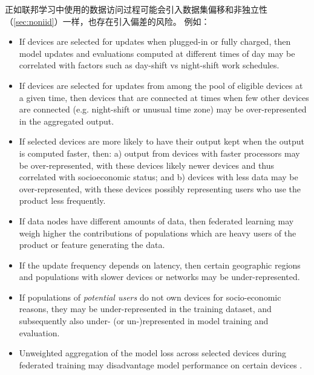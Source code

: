 正如联邦学习中使用的数据访问过程可能会引入数据集偏移和非独立性（\cref{sec:noniid}）一样，也存在引入偏差的风险。 例如：
\begin{itemize}
    \item If devices are selected for updates when plugged-in or fully charged, then model updates and evaluations computed at different times of day may be correlated with factors such as day-shift vs night-shift work schedules.
    \item If devices are selected for updates from among the pool of eligible devices at a given time, then devices that are connected at times when few other devices are connected (e.g. night-shift or unusual time zone) may be over-represented in the aggregated output.
    \item If selected devices are more likely to have their output kept when the output is computed faster, then: a) output from devices with faster processors may be over-represented, with these devices likely newer devices and thus correlated with socioeconomic status; and b) devices with less data may be over-represented, with these devices possibly representing users who use the product less frequently.
    \item If data nodes have different amounts of data, then federated learning may weigh higher the contributions of populations which are heavy users of the product or feature generating the data.
    \item If the update frequency depends on latency, then certain geographic regions and populations with slower devices or networks may be under-represented.
    \item If populations of {\em potential users} do not own devices for socio-economic reasons, they may be under-represented in the training dataset, and subsequently also under- (or un-)represented in model training and evaluation.
    \item Unweighted aggregation of the model loss across selected devices during federated training may disadvantage model performance on certain devices \cite{li2019fair}.
\end{itemize}

